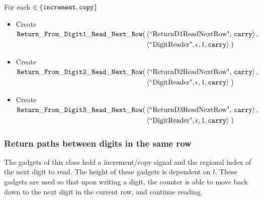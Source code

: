         \noindent For each {\inc} $\in \{ {\tt increment, copy } \}$

        \begin{itemize}
            \item Create
            $\begin{aligned}[t]
                {\tt Return\_From\_Digit1\_Read\_Next\_Row}(& \left \langle \text{``ReturnD1ReadNextRow", {\tt carry}}      \right\rangle, & \\
                                           & \left \langle \text{``DigitReader"}, \epsilon, 1, {\tt carry} \right\rangle \;)
            \end{aligned}$

            \item Create
            $\begin{aligned}[t]
                {\tt Return\_From\_Digit2\_Read\_Next\_Row}(& \left \langle \text{``ReturnD2ReadNextRow", {\tt carry}}      \right\rangle, & \\
                                           & \left \langle \text{``DigitReader"}, \epsilon, 1, {\tt carry} \right\rangle \;)
            \end{aligned}$

            \item Create
            $\begin{aligned}[t]
                {\tt Return\_From\_Digit3\_Read\_Next\_Row}(& \left \langle \text{``ReturnD3ReadNextRow", {\tt carry}}      \right\rangle, & \\
                                             & \left \langle \text{``DigitReader"}, \epsilon, 1, {\tt carry} \right\rangle \;)
            \end{aligned}$
        \end{itemize}
    \vspace{1cm}



    \subsubsection{Return paths between digits in the same row}
        The gadgets of this class hold a increment/copy signal and the regional index
        of the next digit to read. The height of these gadgets is dependent on $l$.
        These gadgets are used so that upon writing a digit, the counter
        is able to move back down to the next digit in the current row, and continue
        reading.
        \vspace{1cm}

